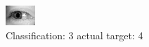 \begin{figure}[h!]
\begin{center}
\includegraphics[width=0.60\columnwidth]{figures/ID3175_class_3_target_4.png}
\end{center}
\caption{ Classification: 3 actual target: 4}
\label{fig:ID3175_class_3_target_4}
\end{figure}

